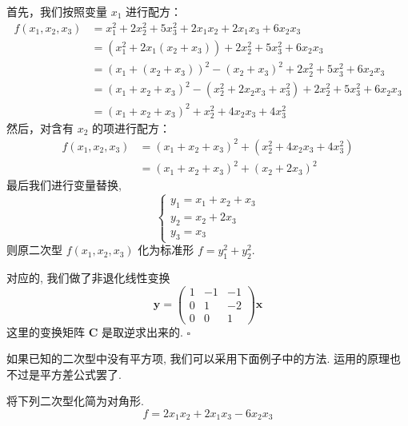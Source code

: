\documentclass[UTF8]{book}
\newenvironment{solution}{{\noindent\it Solution.} }{\hfill $\square$\par}
\begin{document}
\begin{solution}
首先，我们按照变量 \(x_1\) 进行配方：
\begin{align*}
f(x_1,x_2,x_3)&=x_1^2 + 2x_2^2 + 5x_3^2 + 2x_1x_2 + 2x_1x_3 + 6x_2x_3\\
&=(x_1^2+2x_1(x_2 + x_3))+2x_2^2 + 5x_3^2+6x_2x_3\\
&=(x_1+(x_2 + x_3))^2-(x_2 + x_3)^2+2x_2^2 + 5x_3^2+6x_2x_3\\
&=(x_1+x_2 + x_3)^2 - (x_2^2 + 2x_2x_3+x_3^2)+2x_2^2 + 5x_3^2+6x_2x_3\\
&=(x_1+x_2 + x_3)^2+x_2^2 + 4x_2x_3+4x_3^2
\end{align*}
然后，对含有 \(x_2\) 的项进行配方：
\begin{align*}
f(x_1,x_2,x_3)&=(x_1+x_2 + x_3)^2+(x_2^2 + 4x_2x_3+4x_3^2)\\
&=(x_1+x_2 + x_3)^2+(x_2 + 2x_3)^2
\end{align*}
最后我们进行变量替换, 
$$\begin{cases}
y_1=x_1+x_2 + x_3\\
y_2=x_2 + 2x_3\\
y_3=x_3
\end{cases}$$
则原二次型 \(f(x_1,x_2,x_3)\) 化为标准形 \(f = y_1^2 + y_2^2\).

对应的, 我们做了非退化线性变换
\begin{equation*}
    \boldsymbol{y} = 
    \begin{pmatrix}
        1 & -1 & -1 \\
        0 &  1 & -2 \\
        0 &  0 &  1
    \end{pmatrix}
    \boldsymbol{x}
\end{equation*}
这里的变换矩阵 $\boldsymbol{C}$ 是取逆求出来的. 
\end{solution}

如果已知的二次型中没有平方项, 我们可以采用下面例子中的方法. 
运用的原理也不过是平方差公式罢了. 

\begin{example}
    将下列二次型化简为对角形. 
    $$f=2x_1x_2 + 2x_1x_3 - 6x_2x_3$$
\end{example}
\end{document}
